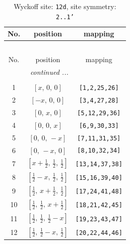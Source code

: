 \documentclass[fleqn,8pt]{jsarticle}
\begin{document}
\begin{longtable}{ccc}
\caption{Wyckoff site: {\tt 12d}, site symmetry: {\tt 2..1'}}
 \\
 \hline \hline
No. & position & mapping \\ \hline \endfirsthead

\multicolumn{2}{l}{\tablename\ \thetable{}} \\
 \hline \hline
No. & position & mapping \\ \hline \endhead

 \hline \hline
\multicolumn{2}{r}{\footnotesize\it continued ...} \\ \endfoot

 \hline \hline
\multicolumn{2}{r}{} \\ \endlastfoot

1 & $\left[ x,\, 0,\, 0 \right]$ & {\tt [1,2,25,26]} \\ \hline
2 & $\left[ - x,\, 0,\, 0 \right]$ & {\tt [3,4,27,28]} \\ \hline
3 & $\left[ 0,\, x,\, 0 \right]$ & {\tt [5,12,29,36]} \\ \hline
4 & $\left[ 0,\, 0,\, x \right]$ & {\tt [6,9,30,33]} \\ \hline
5 & $\left[ 0,\, 0,\, - x \right]$ & {\tt [7,11,31,35]} \\ \hline
6 & $\left[ 0,\, - x,\, 0 \right]$ & {\tt [8,10,32,34]} \\ \hline
7 & $\left[ x + \frac{1}{2},\, \frac{1}{2},\, \frac{1}{2} \right]$ & {\tt [13,14,37,38]} \\ \hline
8 & $\left[ \frac{1}{2} - x,\, \frac{1}{2},\, \frac{1}{2} \right]$ & {\tt [15,16,39,40]} \\ \hline
9 & $\left[ \frac{1}{2},\, x + \frac{1}{2},\, \frac{1}{2} \right]$ & {\tt [17,24,41,48]} \\ \hline
10 & $\left[ \frac{1}{2},\, \frac{1}{2},\, x + \frac{1}{2} \right]$ & {\tt [18,21,42,45]} \\ \hline
11 & $\left[ \frac{1}{2},\, \frac{1}{2},\, \frac{1}{2} - x \right]$ & {\tt [19,23,43,47]} \\ \hline
12 & $\left[ \frac{1}{2},\, \frac{1}{2} - x,\, \frac{1}{2} \right]$ & {\tt [20,22,44,46]} \\
\end{longtable}
\renewcommand{\arraystretch}{1.2}
\end{document}
